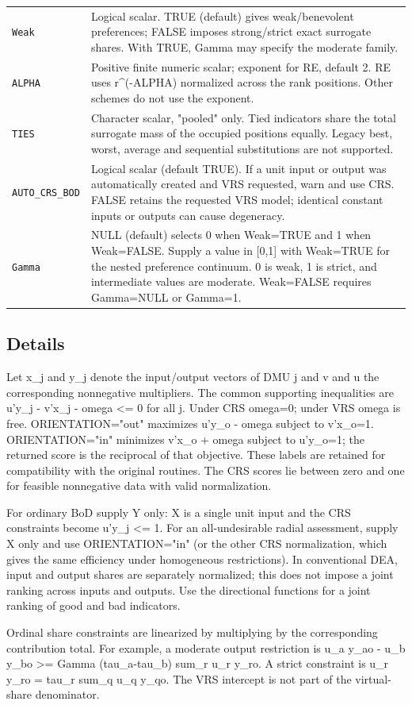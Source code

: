 \documentclass[10pt,a4paper]{article}
\newcommand{\field}[1]{\needspace{3\baselineskip}\subsection*{#1}}
\begin{document}
\begin{longtable}{@{}p{53mm}p{106mm}@{}}
\texttt{Weak} & Logical scalar. TRUE (default) gives weak/benevolent preferences; FALSE imposes strong/strict exact surrogate shares. With TRUE, Gamma may specify the moderate family. \\[2pt]
\texttt{ALPHA} & Positive finite numeric scalar; exponent for RE, default 2. RE uses r\textasciicircum{}(-ALPHA) normalized across the rank positions. Other schemes do not use the exponent. \\[2pt]
\texttt{TIES} & Character scalar, "pooled" only. Tied indicators share the total surrogate mass of the occupied positions equally. Legacy best, worst, average and sequential substitutions are not supported. \\[2pt]
\texttt{AUTO\_CRS\_BOD} & Logical scalar (default TRUE). If a unit input or output was automatically created and VRS requested, warn and use CRS. FALSE retains the requested VRS model; identical constant inputs or outputs can cause degeneracy. \\[2pt]
\texttt{Gamma} & NULL (default) selects 0 when Weak=TRUE and 1 when Weak=FALSE. Supply a value in [0,1] with Weak=TRUE for the nested preference continuum. 0 is weak, 1 is strict, and intermediate values are moderate. Weak=FALSE requires Gamma=NULL or Gamma=1. \\[2pt]
\end{longtable}
\field{Details}
Let x\_j and y\_j denote the input/output vectors of DMU j and v and u the corresponding nonnegative multipliers. The common supporting inequalities are u'y\_j - v'x\_j - omega \textless{}= 0 for all j. Under CRS omega=0; under VRS omega is free. ORIENTATION="out" maximizes u'y\_o - omega subject to v'x\_o=1. ORIENTATION="in" minimizes v'x\_o + omega subject to u'y\_o=1; the returned score is the reciprocal of that objective. These labels are retained for compatibility with the original routines. The CRS scores lie between zero and one for feasible nonnegative data with valid normalization.

For ordinary BoD supply Y only: X is a single unit input and the CRS constraints become u'y\_j \textless{}= 1. For an all-undesirable radial assessment, supply X only and use ORIENTATION="in" (or the other CRS normalization, which gives the same efficiency under homogeneous restrictions). In conventional DEA, input and output shares are separately normalized; this does not impose a joint ranking across inputs and outputs. Use the directional functions for a joint ranking of good and bad indicators.

Ordinal share constraints are linearized by multiplying by the corresponding contribution total. For example, a moderate output restriction is u\_a y\_ao - u\_b y\_bo \textgreater{}= Gamma (tau\_a-tau\_b) sum\_r u\_r y\_ro. A strict constraint is u\_r y\_ro = tau\_r sum\_q u\_q y\_qo. The VRS intercept is not part of the virtual-share denominator.
\end{document}
